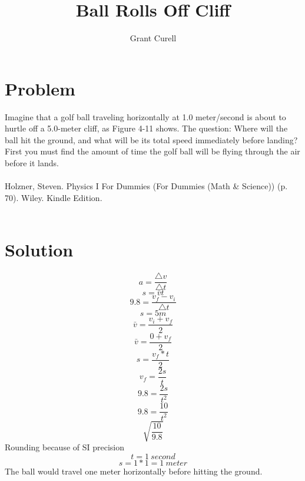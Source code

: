 \documentclass{article}
\title{Ball Rolls Off Cliff}
\author{Grant Curell}
\begin{document}
\maketitle{}
\section{Problem}
Imagine that a golf ball traveling horizontally at 1.0 meter/second is about to hurtle off a 5.0-meter cliff, as Figure 4-11 shows. The question: Where will the ball hit the ground, and what will be its total speed immediately before landing? First you must find the amount of time the golf ball will be flying through the air before it lands.
\\\\
Holzner, Steven. Physics I For Dummies (For Dummies (Math \& Science)) (p. 70). Wiley. Kindle Edition.
\\\\
\section{Solution}
\[ a=\frac{\triangle{v}}{\triangle{t}} \]
\[ s=\bar{v}t \]
\[ 9.8 = \frac{v_f-v_i}{\triangle{t}} \]
\[ s = 5m \]
\[ \bar{v} = \frac{v_i+v_f}{2} \]
\[ \bar{v} = \frac{0+v_f}{2} \]
\[ s=\frac{v_f*t}{2} \]
\[ v_f=\frac{2s}{t} \]
\[ 9.8=\frac{2s}{t^2} \]
\[ 9.8=\frac{10}{t^2} \]
\[ \sqrt{\frac{10}{9.8}} \]
Rounding because of SI precision
\[ t = 1\ second \]
\[ s = 1 * 1 = 1\ meter \]
The ball would travel one meter horizontally before hitting the ground.
\end{document}
